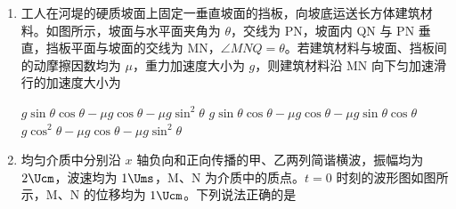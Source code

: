 \documentclass[\gkver]{gaokaozhenti}
\begin{document}
\begin{enumerate}

{$\frac{\sqrt{2}}{2}BLv$}
{$\frac{3}{2}BLv$}
{$\frac{\sqrt{10}}{4}BLv$}


\item
工人在河堤的硬质坡面上固定一垂直坡面的挡板，向坡底运送长方体建筑材料。如图所示，坡面与水平面夹角为 $\theta$，交线为 PN，坡面内 QN 与 PN 垂直，挡板平面与坡面的交线为 MN，$\angle MNQ = \theta$。若建筑材料与坡面、挡板间的动摩擦因数均为 $\mu$，重力加速度大小为 $g$，则建筑材料沿 MN 向下匀加速滑行的加速度大小为


{$g\sin\theta\cos\theta - \mu g\cos\theta - \mu g\sin^{2}\theta$}
{$g\sin\theta\cos\theta - \mu g\cos\theta - \mu g\sin\theta\cos\theta$}
{$g\cos^{2}\theta - \mu g\cos\theta - \mu g\sin^{2}\theta$}


\item
均匀介质中分别沿 $x$ 轴负向和正向传播的甲、乙两列简谐横波，振幅均为 $2 \Ucm$，波速均为 $1 \Ums$，M、N 为介质中的质点。$t = 0$ 时刻的波形图如图所示，M、N 的位移均为 $1 \Ucm$。下列说法正确的是


\end{enumerate}
\end{document}
